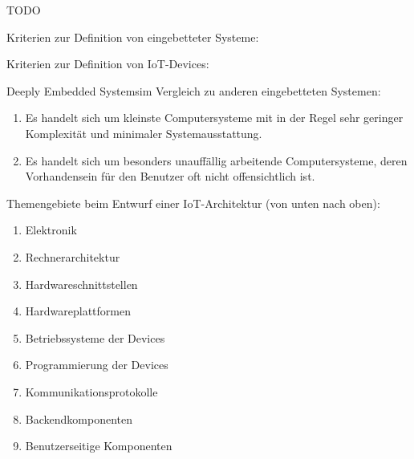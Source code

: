 TODO

\clearpage
\LoesungHeader

\teilaufgabe
Kriterien zur Definition von eingebetteter Systeme:

\teilaufgabe
Kriterien zur Definition von IoT-Devices:

\teilaufgabe
\glqq Deeply Embedded Systems\grqq im Vergleich zu anderen eingebetteten Systemen:

\begin{enumerate}
    \item Es handelt sich um kleinste Computersysteme mit in der Regel sehr
    geringer Komplexität und minimaler Systemausstattung.

    \setcounter{enumi}{2}   %
    \item Es handelt sich um besonders unauffällig arbeitende Computersysteme,
    deren Vorhandensein für den Benutzer oft nicht offensichtlich ist.
\end{enumerate}

\teilaufgabe
Themengebiete beim Entwurf einer IoT-Architektur (von unten nach oben):

\begin{enumerate}
    \item Elektronik
    \item Rechnerarchitektur
    \item Hardwareschnittstellen
    \item Hardwareplattformen
    \item Betriebssysteme der Devices
    \item Programmierung der Devices
    \item Kommunikationsprotokolle
    \item Backendkomponenten
    \item Benutzerseitige Komponenten
\end{enumerate}

